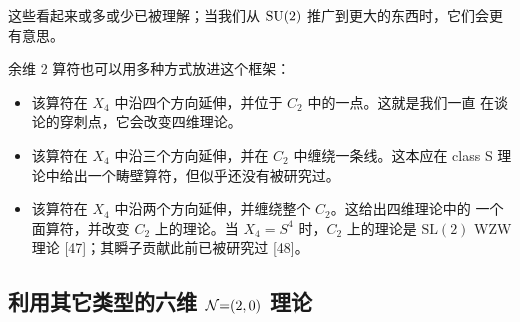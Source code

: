 这些看起来或多或少已被理解；当我们从 $\mathrm{SU}(2)$ 推广到更大的东西时，它们会更
有意思。


余维 2 算符也可以用多种方式放进这个框架：

\begin{itemize}
\item 该算符在 $X_4$ 中沿四个方向延伸，并位于 $C_2$ 中的一点。这就是我们一直
  在谈论的穿刺点，它会改变四维理论。
\item 该算符在 $X_4$ 中沿三个方向延伸，并在 $C_2$ 中缠绕一条线。这本应在
  class S 理论中给出一个畴壁算符，但似乎还没有被研究过。
\item 该算符在 $X_4$ 中沿两个方向延伸，并缠绕整个 $C_2$。这给出四维理论中的
  一个面算符，并改变 $C_2$ 上的理论。当 $X_4=S^4$ 时，$C_2$ 上的理论是
  $\mathrm{SL}(2)$ WZW 理论 [47]；其瞬子贡献此前已被研究过 [48]。
\end{itemize}


\subsection{利用其它类型的六维 $\mathcal{N}{=}(2,0)$ 理论}

